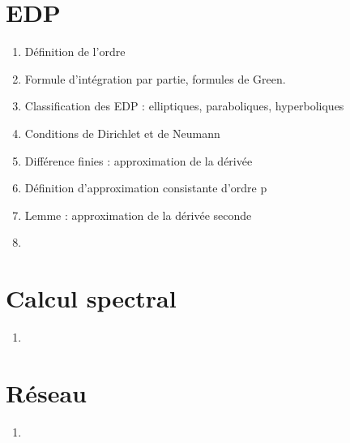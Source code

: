 \documentclass{article}
\begin{document}
\part{EDP}
\begin{enumerate}
\item Définition de l'ordre
\item Formule d'intégration par partie, formules de Green.
\item Classification des EDP : elliptiques, paraboliques, hyperboliques
\item Conditions de Dirichlet et de Neumann
\item Différence finies : approximation de la dérivée
\item Définition d'approximation consistante d'ordre p
\item Lemme : approximation de la dérivée seconde
\item 
\end{enumerate}

\part{Calcul spectral}
\begin{enumerate}
\item 
\end{enumerate}

\part{Réseau}
\begin{enumerate}
\item 
\end{enumerate}
\end{document}
